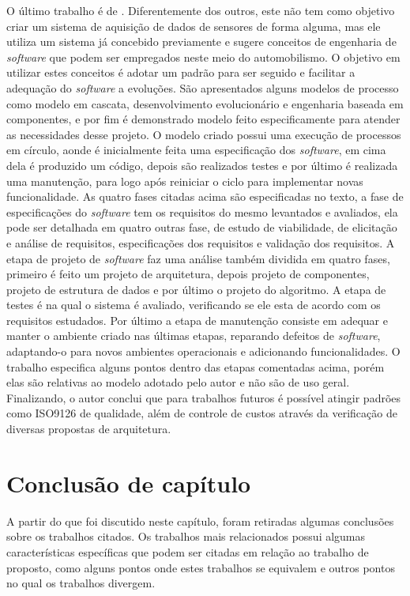 O último trabalho é de . Diferentemente dos outros, este não tem como objetivo criar um sistema de aquisição de dados de sensores de forma alguma, mas ele utiliza um sistema já concebido previamente e sugere conceitos de engenharia de \textit{software} que podem ser empregados neste meio do automobilismo. O objetivo em utilizar estes conceitos é adotar um padrão para ser seguido e facilitar a adequação do \textit{software} a evoluções. São apresentados alguns modelos de processo como modelo em cascata, desenvolvimento evolucionário e engenharia baseada em componentes, e por fim é demonstrado modelo feito especificamente para atender as necessidades desse projeto. O modelo criado possui uma execução de processos em círculo, aonde é inicialmente feita uma especificação dos \textit{software}, em cima dela é produzido um código, depois são realizados testes e por último é realizada uma manutenção, para logo após reiniciar o ciclo para implementar novas funcionalidade. As quatro fases citadas acima são especificadas no texto, a fase de especificações do \textit{software} tem os requisitos do mesmo levantados e avaliados, ela pode ser detalhada em quatro outras fase, de estudo de viabilidade, de elicitação e análise de requisitos, especificações dos requisitos e validação dos requisitos. A etapa de projeto de \textit{software} faz uma análise também dividida em quatro fases, primeiro é feito um projeto de arquitetura, depois projeto de componentes, projeto de estrutura de dados e por último o projeto do algoritmo. A etapa de testes é na qual o sistema é avaliado, verificando se ele esta de acordo com os requisitos estudados. Por último a etapa de manutenção consiste em adequar e manter o ambiente criado nas últimas etapas, reparando defeitos de \textit{software}, adaptando-o para novos ambientes operacionais e adicionando funcionalidades. O trabalho especifica alguns pontos dentro das etapas comentadas acima, porém elas são relativas ao modelo adotado pelo autor e não são de uso geral. Finalizando, o autor conclui que para trabalhos futuros é possível atingir padrões como ISO9126 de qualidade, além de controle de custos através da verificação de diversas propostas de arquitetura. 

\section{Conclusão de capítulo}
A partir do que foi discutido neste capítulo, foram retiradas algumas conclusões sobre os trabalhos citados. Os trabalhos mais relacionados possui algumas características específicas que podem ser citadas em relação ao trabalho de proposto, como alguns pontos onde estes trabalhos se equivalem e outros pontos no qual os trabalhos divergem. 

